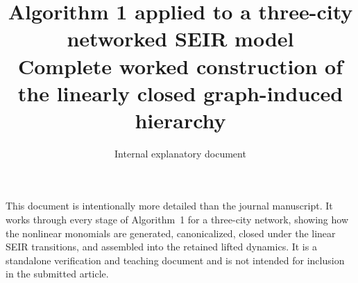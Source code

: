 \documentclass[11pt]{article}
\title{Algorithm 1 applied to a three-city networked SEIR model\\
\large Complete worked construction of the linearly closed graph-induced hierarchy}
\author{Internal explanatory document}
\date{}
\begin{document}
\maketitle

\begin{center}
\begin{minipage}{0.9\textwidth}
\small
This document is intentionally more detailed than the journal manuscript. It
works through every stage of Algorithm~1 for a three-city network, showing how
the nonlinear monomials are generated, canonicalized, closed under the linear
SEIR transitions, and assembled into the retained lifted dynamics. It is a
standalone verification and teaching document and is not intended for inclusion
in the submitted article.
\end{minipage}
\end{center}

\tableofcontents
\newpage













\appendix



\end{document}
